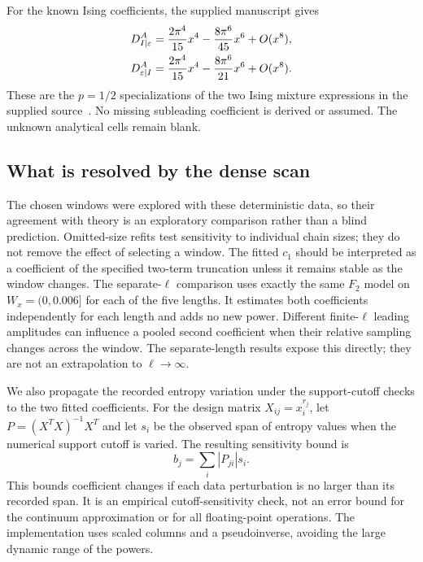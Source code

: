 For the known Ising coefficients, the supplied manuscript gives
\begin{align}
 D^A_{I\mid\varepsilon}&=\frac{2\pi^4}{15}x^4-\frac{8\pi^6}{45}x^6+O(x^8),\nonumber\\
 D^A_{\varepsilon\mid I}&=\frac{2\pi^4}{15}x^4-\frac{8\pi^6}{21}x^6+O(x^8).
 \label{eq:dense-known-ising}
\end{align}
These are the $p=1/2$ specializations of the two Ising mixture
expressions in the supplied source~\cite{theoryLarge}. No missing
subleading coefficient is derived or assumed. The unknown analytical
cells remain blank.

\subsection{What is resolved by the dense scan}

The chosen windows were explored with these deterministic data, so
their agreement with theory is an exploratory comparison rather than
a blind prediction. Omitted-size refits test sensitivity to individual
chain sizes; they do not remove the effect of selecting a window.
The fitted $c_1$ should be interpreted as a coefficient of the specified
two-term truncation unless it remains stable as the window changes.
The separate-$\ell$ comparison uses exactly the same $F_2$ model on
$W_x=(0,0.006]$ for each of the five lengths. It estimates both
coefficients independently for each length and adds no new power.
Different finite-$\ell$ leading amplitudes can influence a pooled
second coefficient when their relative sampling changes across the
window. The separate-length results expose this directly; they are
not an extrapolation to $\ell\to\infty$.

We also propagate the recorded entropy variation under the support-cutoff
checks to the two fitted coefficients. For the design matrix
$X_{ij}=x_i^{r_j}$, let $P=(X^TX)^{-1}X^T$ and let $s_i$ be the
observed span of entropy values when the numerical support cutoff is
varied. The resulting sensitivity bound is
\begin{equation}
 b_j=\sum_i |P_{ji}|s_i.
 \label{eq:dense-cutoff-bound}
\end{equation}
This bounds coefficient changes if each data perturbation is no larger
than its recorded span. It is an empirical cutoff-sensitivity check,
not an error bound for the continuum approximation or for all
floating-point operations. The implementation uses scaled columns
and a pseudoinverse, avoiding the large dynamic range of the powers.

